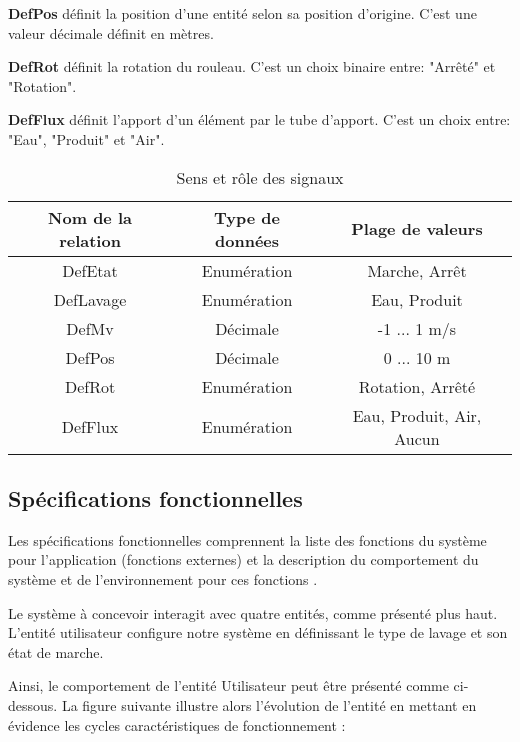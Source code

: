 \textbf{DefPos} définit la position d'une entité selon sa position d'origine.
C'est une valeur décimale définit en mètres.

\textbf{DefRot} définit la rotation du rouleau.
C'est un choix binaire entre: "Arrêté" et "Rotation".

\textbf{DefFlux} définit l'apport d'un élément par le tube d'apport.
C'est un choix entre: "Eau", "Produit" et "Air".

\begin{table}[H]
	\centering
	\begin{tabular}{|c|c|c|}
		\hline
		Nom de la relation         & Type de données  & Plage de valeurs \\
		\hline
		DefEtat                    & Enumération  	  & {Marche, Arrêt} \\
		\hline
		DefLavage                  & Enumération  	  & {Eau, Produit} \\
		\hline
		DefMv                      & Décimale  		  & -1 ... 1 m/s \\
		\hline
		DefPos                     & Décimale  		  & 0 ... 10 m  \\
    	\hline
		DefRot                     & Enumération  	  & {Rotation, Arrêté} \\
		\hline
		DefFlux                    & Enumération  	  & {Eau, Produit, Air, Aucun} \\
		\hline
	\end{tabular}
	\caption{Sens et rôle des signaux}
	\label{tab:types_fonc}
\end{table}

\subsection{Spécifications fonctionnelles}
Les spécifications fonctionnelles comprennent la liste des fonctions du système
pour l'application (fonctions externes) et la description du comportement du système et
de l'environnement pour ces fonctions \cite{Calvez_2}.

\gap

Le système à concevoir interagit avec quatre entités, comme présenté plus haut.
L'entité utilisateur configure notre système en définissant le type de lavage et son état de marche.

Ainsi, le comportement de l'entité Utilisateur peut être présenté comme ci-dessous. 
La figure suivante illustre alors l'évolution de l'entité en mettant en évidence les cycles caractéristiques de fonctionnement :

